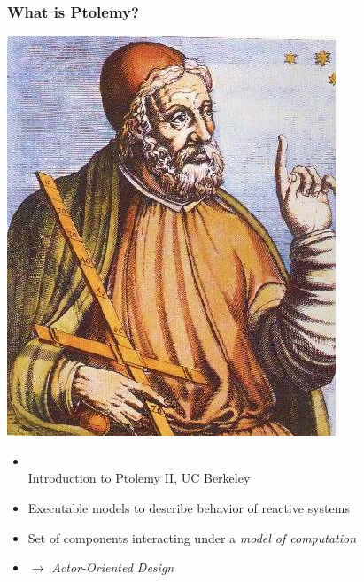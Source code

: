 \begin{frame}
  \frametitle{What is Ptolemy?}
  
\begin{center}
\includegraphics[scale=0.20]{images/clausptolemaeus.jpg}
\end{center}
  
\begin{itemize}
	\item {}
	\tiny\\\hspace{5cm}Introduction to Ptolemy II, UC Berkeley
 	\pause
 	\small
  \item Executable models to describe behavior of reactive systems
	\pause
	\item Set of components interacting under a \emph{model of computation}
	\pause
	\item $\rightarrow$ \emph{Actor-Oriented Design}
\end{itemize}
  
\end{frame}


